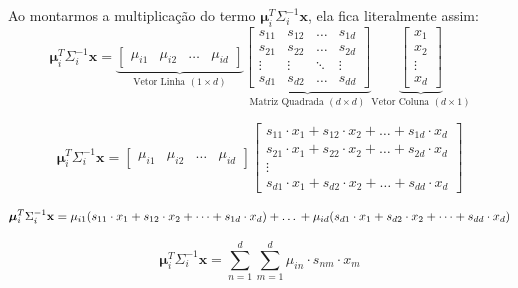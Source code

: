 \documentclass[12pt, a4paper]{article}
\begin{document}
Ao montarmos a multiplicação do termo $\boldsymbol{\mu}_i^T \Sigma_i^{-1} \mathbf{x}$, ela fica literalmente assim:
\begin{equation*}
    \boldsymbol{\mu}_i^T \Sigma_i^{-1} \mathbf{x} = 
    \underbrace{\begin{bmatrix} \mu_{i1} & \mu_{i2} & \dots & \mu_{id} \end{bmatrix}}_{\text{Vetor Linha } (1 \times d)}
    \underbrace{\begin{bmatrix} s_{11} & s_{12} & \dots & s_{1d} \\ s_{21} & s_{22} & \dots & s_{2d} \\ \vdots & \vdots & \ddots & \vdots \\ s_{d1} & s_{d2} & \dots & s_{dd} \end{bmatrix}}_{\text{Matriz Quadrada } (d \times d)}
    \underbrace{\begin{bmatrix} x_1 \\ x_2 \\ \vdots \\ x_d \end{bmatrix}}_{\text{Vetor Coluna } (d \times 1)}
\end{equation*}

\begin{equation*}
    \boldsymbol{\mu}_i^T \Sigma_i^{-1} \mathbf{x} = \begin{bmatrix} \mu_{i1} & \mu_{i2} & \dots & \mu_{id} 
    \end{bmatrix}
    \begin{bmatrix}
    s_{11} \cdot x_1 + s_{12} \cdot x_2 + \dots + s_{1d} \cdot x_d \\
    s_{21} \cdot x_1 + s_{22} \cdot x_2 + \dots + s_{2d} \cdot x_d \\ 
    \vdots \\
    s_{d1} \cdot x_1 + s_{d2} \cdot x_2 + \dots + s_{dd} \cdot x_d
    \end{bmatrix}
\end{equation*}

\begin{equation*}
    \boldsymbol{\mu}_i^T \Sigma_i^{-1} \mathbf{x} = 
    \mu_{i1}(s_{11} \cdot x_1 + s_{12} \cdot x_2 + \dots + s_{1d} \cdot x_d )\\
    + \ldots \\
    + \mu_{id}(s_{d1} \cdot x_1 + s_{d2} \cdot x_2 + \dots + s_{dd} \cdot x_d)
\end{equation*}

\begin{equation*}
    \boldsymbol{\mu}_i^T \Sigma_i^{-1} \mathbf{x} =
    \sum_{n=1}^d \sum_{m=1}^d
    \mu_{i n} \cdot s_{n m} \cdot x_{m}
\end{equation*}
\end{document}
